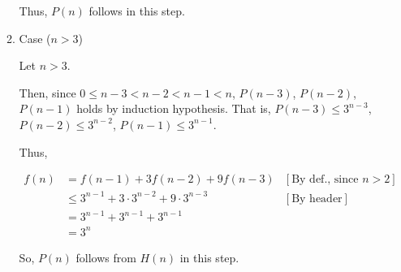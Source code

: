 \documentclass[12pt]{article}
\begin{document}
\begin{itemize}
\begin{mdframed}
\begin{enumerate}[1.]
\begin{mdframed}
        \bigskip

        Thus, $P(n)$ follows in this step.
        \end{mdframed}

        \item Case ($n > 3$)

        \begin{mdframed}
        Let $n > 3$.

        \bigskip

        Then, since $0 \leq n-3 < n-2 < n-1 < n$, $P(n-3)$, $P(n-2)$, $P(n-1)$
        holds by induction hypothesis. That is, $P(n-3) \leq 3^{n-3}$, $P(n-2) \leq 3^{n-2}$,
        $P(n-1) \leq 3^{n-1}$.

        \bigskip

        Thus,

        \begin{align}
            f(n) &= f(n-1) + 3f(n-2) + 9f(n-3) & [\text{By def., since $n > 2$}]\\
            &\leq 3^{n-1} + 3 \cdot 3^{n-2} + 9 \cdot 3^{n-3} & [\text{By header}]\\
            &= 3^{n-1} + 3^{n-1} + 3^{n-1}\\
            &= 3^n
        \end{align}

        \bigskip

        So, $P(n)$ follows from $H(n)$ in this step.
        \end{mdframed}
    \end{enumerate}
    \end{mdframed}
\end{itemize}
\end{document}
